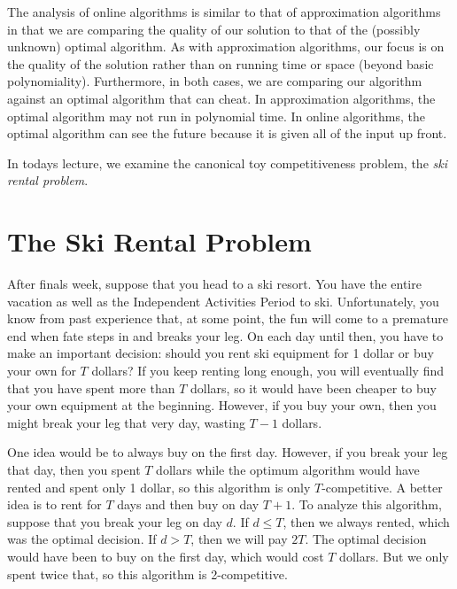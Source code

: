 \documentclass{article}
\begin{document}
The analysis of online algorithms is similar to that of
approximation algorithms in that we are comparing the quality of
our solution to that of the (possibly unknown) optimal algorithm.
As with approximation algorithms, our focus is on the quality of
the solution rather than on running time or space (beyond basic
polynomiality). Furthermore, in both cases, we are comparing our
algorithm against an optimal algorithm that can cheat. In
approximation algorithms, the optimal algorithm may not run in
polynomial time. In online algorithms, the optimal algorithm can
see the future because it is given all of the input up front.

In todays lecture, we examine the canonical toy competitiveness problem,
the \emph{ski rental problem}.

\section{The Ski Rental Problem}

After finals week, suppose that you head to a ski resort. You have
the entire vacation as well as the Independent Activities Period
to ski. Unfortunately, you know from past experience that, at some
point, the fun will come to a premature end when fate steps in and
breaks your leg. On each day until then, you have to make an
important decision: should you rent ski equipment for 1 dollar or
buy your own for $T$ dollars? If you keep renting long enough, you
will eventually find that you have spent more than $T$ dollars, so
it would have been cheaper to buy your own equipment at the
beginning. However, if you buy your own, then you might break your
leg that very day, wasting $T-1$ dollars.

One idea would be to always buy on the first day. However, if you
break your leg that day, then you spent $T$ dollars while the
optimum algorithm would have rented and spent only 1 dollar, so
this algorithm is only $T$-competitive. A better idea is to rent
for $T$ days and then buy on day $T+1$. To analyze this algorithm,
suppose that you break your leg on day $d$. If $d\leq T$, then we
always rented, which was the optimal decision. If $d>T$, then we
will pay $2T$. The optimal decision would have been to buy on the
first day, which would cost $T$ dollars. But we only spent twice
that, so this algorithm is 2-competitive.
\end{document}

